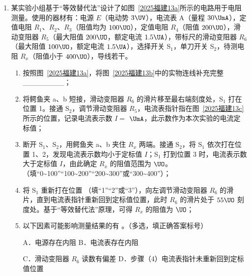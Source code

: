 \documentclass[\gkver]{gaokaozhenti}
\begin{document}
\begin{enumerate}
\item
某实验小组基于“等效替代法”设计了如图~\ref{2025福建13a}所示的电路用于电阻测量。使用的器材有：电源 $E$（电动势 $3 \UV$），电流表 A（量程 $30 \UmA$），定值电阻 $R_{1}$、$R_{2}$、$R_{3}$（阻值均为 $100 \UO$），定值电阻 $R_{4}$（阻值 $200 \UO$），滑动变阻器 $R_{5}$（最大阻值 $200 \UO$，额定电流 $1.5 \UA$），带标尺的滑动变阻器 $R_{6}$（最大阻值 $100 \UO$，额定电流 $1.5 \UA$），选择开关 S$_{1}$，单刀开关 S$_{2}$，待测电阻 $R_{x}$（阻值小于 $400 \UO$），导线若干。
\begin{enumerate}
	\item
	按照图~\ref{2025福建13a}，将图~\ref{2025福建13b}中的实物连线补充完整\_\_\_\_\_\_\_\_；
	\item
	将鳄鱼夹 a、b 短接，滑动变阻器 $R_{6}$ 的滑片移至最右端刻度处，S$_{1}$ 打在位置 1。接通 S$_{2}$，调节滑动变阻器 $R_{5}$，电流表指针指在图~\ref{2025福建13c}所示的位置，记录电流表示数 $I =$  $\UmA$，此示数作为本次实验的电流定标值；
	\item
	断开 S$_{1}$、S$_{2}$，用鳄鱼夹 a、b 夹住 $R_{x}$ 两端。接通 S$_{2}$，将 S$_{1}$ 依次打在位置 1、2，发现电流表示数均小于定标值 $I$；S$_{1}$ 打到位置 3 时，电流表示数大于定标值 $I$，由此确定 $R_{x}$ 的阻值范围为  $\UO$。（填“0\textasciitilde{}100”“100\textasciitilde{}200”“200\textasciitilde{}300”或“300\textasciitilde{}400”）；
	\item
	将 S$_{1}$ 重新打在位置 （填“1”“2”或“3”），向左调节滑动变阻器 $R_{6}$ 的滑片，直到电流表指针重新回到定标值位置，此时 $R_{6}$ 的滑片处于 $55 \UO$ 刻度处。基于“等效替代法”原理，可得 $R_{x}$ 的阻值为  $\UO$；
	\item
	以下因素可能影响测量结果的有 。（多选，填正确答案标号）

	A．电源存在内阻 \quad B．电流表存在内阻

	C．滑动变阻器 $R_{6}$ 读数有偏差 \quad D．步骤（4）电流表指针未重新回到定标值位置
\end{enumerate}



\end{enumerate}
\end{document}

